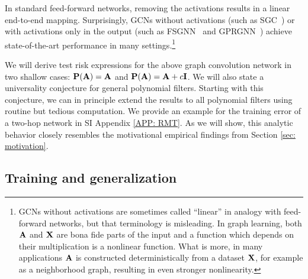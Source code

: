 \documentclass[9pt,twocolumn]{pnas-new}
\begin{document}

In standard feed-forward networks, removing the activations results in a linear end-to-end mapping. Surprisingly, GCNs without activations (such as SGC~\cite{wu2019simplifying}) or with activations only in the output (such as FSGNN~\cite{maurya2021improving} and GPRGNN~\cite{chien2021adaptive}) achieve state-of-the-art performance in many settings.\footnote{GCNs without activations are sometimes called ``linear'' in analogy with feed-forward networks, but that terminology is misleading. In graph learning, both $\mathbf{A}$ and $\mathbf{X}$ are bona fide parts of the input and a function which depends on their multiplication is a nonlinear function. What is more, in many applications $\mathbf{A}$ is constructed deterministically from a dataset $\mathbf{X}$, for example as a neighborhood graph, resulting in even stronger nonlinearity.}


We will derive test risk expressions for the above graph convolution network in two shallow cases: $\mathbf{P}(\mathbf{A}) = \mathbf{A}$ and $\mathbf{P}(\mathbf{A}) = \mathbf{A} + c\mathbf{I}$. We will also state a universality conjecture for general polynomial filters. Starting with this conjecture, we can in principle extend the results to all polynomial filters using routine but tedious computation. We provide an example for the training error of a two-hop network in SI Appendix \ref{APP: RMT}. As we will show, this analytic behavior closely resembles the motivational empirical findings from Section \ref{sec: motivation}.


\subsection*{Training and generalization}
\end{document}
